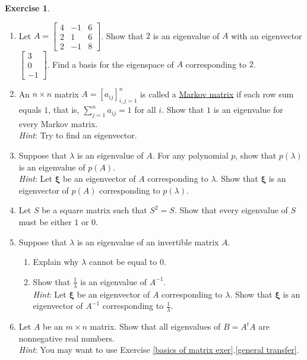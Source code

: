 \documentclass[12pt,letterpaper]{book}
\numberwithin{equation}{section}
\theoremstyle{definition}
\newtheorem{exercise}{\textbf{Exercise}}[chapter]
\newcommand{\vxi}{\bm{\xi}}
\begin{document}
\begin{exercise}\label{evev exer}\quad
\begin{enumerate}[\bfseries 1.]
\item Let $A=\left[\begin{array}{rrr} 4 & -1 & 6 \\
2 & 1 & 6 \\ 2 & -1 & 8 \end{array}\right]$. Show that $2$ is an
eigenvalue of $A$ with an eigenvector $\left[\begin{array}{r} 3 \\
0 \\ -1
\end{array}\right]$. Find a basis for the eigenspace of $A$
corresponding to $2$.

\item An $n\times n$ matrix $A=[a_{ij}]_{i,j=1}^n$ is called a \underline{Markov matrix} if each row sum equals $1$, that is, $\displaystyle{\sum_{j=1}^n a_{ij}=1}$ for all $i$. Show that $1$ is an eigenvalue for every Markov matrix.\\
\textit{Hint}: Try to find an eigenvector.

\item \label{poly eigenvalue} Suppose that $\lambda$ is an eigenvalue of $A$. For any polynomial $p$, show that $p(\lambda)$ is an eigenvalue of $p(A)$.\\
\textit{Hint}: Let $\vxi$ be an eigenvector of $A$ corresponding to $\lambda$. Show that $\vxi$ is an eigenvector of $p(A)$ corresponding to $p(\lambda)$.

\item\label{proj 1 or 0} Let $S$ be a square matrix such that $S^2=S$. Show that every eigenvalue of $S$ must be either $1$ or $0$. 

\item Suppose that $\lambda$ is an eigenvalue of an invertible matrix $A$.
\begin{enumerate}
\item Explain why $\lambda$ cannot be equal to $0$.
\item Show that $\frac{1}{\lambda}$ is an eigenvalue of $A^{-1}$.\\
\textit{Hint}: Let $\vxi$ be an eigenvector of $A$ corresponding to $\lambda$. Show that $\vxi$ is an eigenvector of $A^{-1}$ corresponding to $\frac{1}{\lambda}$.
\end{enumerate}

\item\label{evpositive} Let $A$ be an $m\times n$ matrix. Show that all eigenvalues of $B=A^tA$ are nonnegative real numbers. \\
\textit{Hint}: You may want to use Exercise \ref{basics of matrix exer}.\ref{general transfer}.
\end{enumerate}
\end{exercise}
\end{document}
